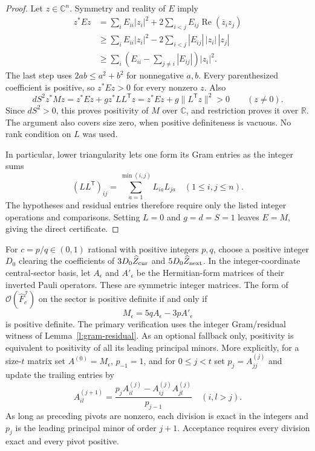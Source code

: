 \begin{proof}
Let \(z\in\mathbb C^n\).  Symmetry and reality of \(E\) imply
\begin{align*}
 z^*Ez
 &=\sum_iE_{ii}|z_i|^2+
           2\sum_{i<j}E_{ij}\operatorname{Re}(\overline z_i z_j)\\
 &\ge\sum_iE_{ii}|z_i|^2-
           2\sum_{i<j}|E_{ij}|\,|z_i|\,|z_j|\\
 &\ge\sum_i\left(E_{ii}-\sum_{j\ne i}|E_{ij}|\right)|z_i|^2.
\end{align*}
The last step uses \(2ab\le a^2+b^2\) for nonnegative \(a,b\).
Every parenthesized coefficient is positive, so \(z^*Ez>0\)
for every nonzero \(z\).  Also
\[
 dS^2 z^*Mz=z^*Ez+g z^*LL^{\mathsf T}z
             =z^*Ez+g\|L^{\mathsf T}z\|^2>0
             \qquad(z\ne0).
\]
Since \(dS^2>0\), this proves positivity of \(M\) over
\(\mathbb C\), and restriction proves it over \(\mathbb R\).
The argument also covers size zero, when positive definiteness
is vacuous.  No rank condition on \(L\) was used.

In particular, lower triangularity lets one form its Gram entries
as the integer sums
\[
 (LL^{\mathsf T})_{ij}
       =\sum_{a=1}^{\min(i,j)}L_{ia}L_{ja}
       \quad(1\le i,j\le n).
\]
The hypotheses and residual entries therefore require only the
listed integer operations and comparisons.  Setting \(L=0\)
and \(g=d=S=1\) leaves \(E=M\), giving the direct certificate.
\end{proof}

\begin{lemma}\label{l:integercheck}
For \(c=p/q\in(0,1)\) rational with positive integers \(p,q\),
choose a positive integer \(D_0\) clearing the coefficients of
\(3D_0\widehat Z_{\rm cur}\) and \(5D_0\widehat Z_{\rm next}\).
In the integer-coordinate central-sector basis, let \(A_\epsilon\)
and \(A'_\epsilon\) be the Hermitian-form matrices of their
inverted Pauli operators. These are symmetric integer matrices.
The form of \(\mathcal O(\widehat F_c^{\mathcal I})\) on the sector
is positive definite if and only if
\[
 M_\epsilon=5qA_\epsilon-3pA'_\epsilon
\]
is positive definite. The primary verification uses the integer
Gram/residual witness of Lemma~\ref{l:gram-residual}.
As an optional fallback only, positivity is equivalent to positivity of all its
leading principal minors. More explicitly, for a size-\(t\) matrix
set \(A^{(0)}=M_\epsilon\), \(p_{-1}=1\), and for \(0\le j<t\)
set \(p_j=A^{(j)}_{jj}\) and update the trailing entries by
\[
 A^{(j+1)}_{il}
    =\frac{p_jA^{(j)}_{il}-A^{(j)}_{ij}A^{(j)}_{jl}}{p_{j-1}}
       \quad(i,l>j).
\]
As long as preceding pivots are nonzero, each division is exact
in the integers and \(p_j\) is the leading principal minor of
order \(j+1\). Acceptance requires every division exact and every
pivot positive.
\end{lemma}

